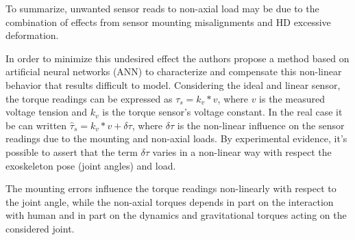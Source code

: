 \documentclass[journal]{IEEEtran}
\begin{document}
\par To summarize, unwanted sensor reads to non-axial load may be due to the combination of effects from sensor mounting misalignments and HD excessive deformation. 
\par In order to minimize this undesired effect the authors propose a method based on artificial neural networks (ANN) to characterize and compensate this non-linear behavior that results difficult to model.
%
%
Considering the ideal and linear sensor, the torque readings can be expressed as $\tau_s = k_v * v$, where $v$ is the measured voltage tension and $k_v$ is the torque sensor's voltage constant. In the real case it be can written $\hat{\tau}_s = k_v * v + \delta\tau$, where $\delta\tau$ is the non-linear influence on the sensor readings due to the mounting and non-axial loads.
By experimental evidence, it's possible to assert that the term $\delta\tau$ varies in a non-linear way with respect the exoskeleton pose (joint angles) and load.
\par The mounting errors influence the torque readings non-linearly with respect to the joint angle, while the non-axial torques depends in part on the interaction with human and in part on the dynamics and gravitational torques acting on the considered joint.
%
\end{document}
